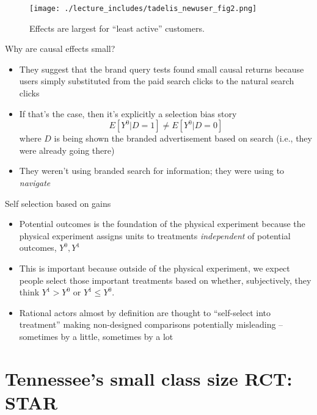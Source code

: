 \documentclass{beamer}
\begin{document}
\begin{frame}

\begin{figure}
\begin{center}
\texttt{[image: ./lecture\_includes/tadelis\_newuser\_fig2.png]}
\caption{Effects are largest for ``least active'' customers. }
\end{center}
\end{figure}

\end{frame}


\begin{frame}{Why are causal effects small?}

\begin{itemize}
\item They suggest that the brand query tests found small causal returns because users simply substituted from the paid search clicks to the natural search clicks
\item If that's the case, then it's explicitly a selection bias story $$E[Y^0|D=1] \neq E[Y^0|D=0]$$ where $D$ is being shown the branded advertisement based on search (i.e., they were already going there)
\item They weren't using branded search for information; they were using to \emph{navigate}
\end{itemize}

\end{frame}

\begin{frame}{Self selection based on gains}

\begin{itemize}
\item Potential outcomes is the foundation of the physical experiment because the physical experiment assigns units to treatments \emph{independent} of potential outcomes, $Y^0,Y^1$
\item This is important because outside of the physical experiment, we expect people select those important treatments based on whether, subjectively, they think $Y^1>Y^0$ or $Y^1\leq Y^0$. 
\item Rational actors almost by definition are thought to ``self-select into treatment'' making non-designed comparisons potentially misleading -- sometimes by a little, sometimes by a lot
\end{itemize}

\end{frame}

\section{Tennessee's small class size RCT: STAR}
\end{document}
